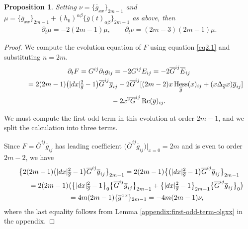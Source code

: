 \documentclass[11pt]{article}
\numberwithin{equation}{section}
\newtheorem{Proposition}[Theorem]{Proposition}
 { \theoremstyle{definition}
\newtheorem{Definition}[Theorem]{Definition}
\newtheorem{Example}[Theorem]{Example}
\newtheorem{Remark}[Theorem]{Remark} }
\newcommand{\olg}{\overline{g}}
\newcommand{\olG}{\overline{G}}
\newcommand{\gbar}{\overline{g}}
\DeclareMathOperator{\Rc}{Rc}
\DeclareMathOperator{\hess}{Hess}
\begin{document}
\begin{Proposition} \label{prop:linear-system} Setting $\nu = \{\olg_{xx}\}_{2m-1}$ and $\mu = \{\olg_{xx}\}_{2m-1} + (h_0)^{\alpha \beta} \{\olg(t)_{\alpha \beta}\}_{2m-1}$
as above, then
\begin{gather*}%
 \partial_t \mu = -2(2m-1) \mu, \qquad
 \partial_t \nu = (2m-3)(2m-1) \mu.
\end{gather*}
\end{Proposition}
\begin{proof}We compute the evolution equation of $F$ using equation \eqref{eq2.1} and substituting $n = 2m$.
\begin{gather*}%
\partial_t F = G^{ij} \partial_t g_{ij} = - 2 G^{ij} E_{ij} = -2 \olG^{ij} \overline{E}_{ij} \\
\hphantom{\partial_t F}{} = 2 (2m-1) \big(|{\rm d}x|^2_{\gbar}-1\big) \olG^{ij} \olg_{ij} -2 \olG^{ij} [ (2m-2) x\hess_{\olg} (x)_{ij} +(x\Delta_{\olg} x) \olg_{ij} ]\\
\hphantom{\partial_t F=}{} -2 x^2\olG^{ij}\Rc(\gbar)_{ij} .
\end{gather*}

We must compute the first odd term in this evolution at order $2m-1$, and we split the calculation into three terms.

Since
$F = \olG^{ij} \olg_{ij}$ has leading coefficient $\big(\olG^{ij} \olg_{ij} \big)\vert_{x=0} = 2m$ and is even to order $2m-2$, we have
\begin{gather*}%
\big\{ 2 (2m-1) \big(|{\rm d}x|^2_{\gbar}-1\big) \olG^{ij} \olg_{ij}\big\}_{2m-1}
= 2 (2m-1) \big\{\big(|{\rm d}x|^2_{\gbar}-1\big) \olG^{ij} \gbar_{ij} \big\}_{2m-1} \\
\qquad{}= 2 (2m-1) \big( \big\{|{\rm d}x|^2_{\gbar}-1\big\}_0 \big\{ \olG^{ij} \gbar_{ij}\big\}_{2m-1} + \big\{|{\rm d}x|^2_{\gbar}-1\big\}_{2m-1}
\big\{ \olG^{ij} \gbar_{ij}\big\}_{0}\big) \\
\qquad{} = 4m (2m-1) \{\gbar^{xx} \}_{2m-1} = -4m(2m-1) \nu ,
\end{gather*}
where the last equality follows from Lemma \ref{appendix:first-odd-term-olgxx} in the appendix.


\end{proof}
\end{document}
